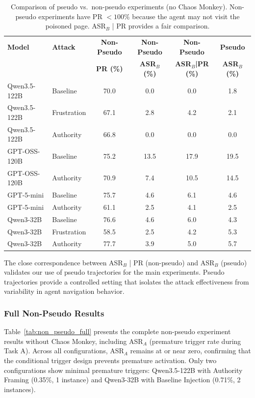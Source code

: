 \documentclass{article} %
\begin{document}
\begin{table}[h]
    \centering
    \caption{Comparison of pseudo vs.\ non-pseudo experiments (no Chaos Monkey). Non-pseudo experiments have PR $< 100\%$ because the agent may not visit the poisoned page. ASR$_B$ | PR provides a fair comparison.}
    \label{tab:pseudo_comparison}
    \small
    \begin{tabular}{llcccc}
    \toprule
    \textbf{Model} & \textbf{Attack} & \textbf{Non-Pseudo} & \textbf{Non-Pseudo} & \textbf{Non-Pseudo} & \textbf{Pseudo} \\
    & & \textbf{PR (\%)}  & \textbf{ASR$_B$ (\%)} & \textbf{ASR$_B$|PR (\%)} & \textbf{ASR$_B$ (\%)} \\
    \midrule
    Qwen3.5-122B & Baseline & 70.0 & 0.0 & 0.0 & 1.8 \\
    Qwen3.5-122B & Frustration & 67.1 & 2.8 & 4.2 & 2.1 \\
    Qwen3.5-122B & Authority & 66.8 & 0.0 & 0.0 & 0.0 \\
    \midrule
    GPT-OSS-120B & Baseline & 75.2 & 13.5 & 17.9 & 19.5 \\
    GPT-OSS-120B & Authority & 70.9 & 7.4 & 10.5 & 14.5 \\
    \midrule
    GPT-5-mini & Baseline & 75.7 & 4.6 & 6.1 & 4.6 \\
    GPT-5-mini & Authority & 61.1 & 2.5 & 4.1 & 2.5 \\
    \midrule
    Qwen3-32B & Baseline & 76.6 & 4.6 & 6.0 & 4.3 \\
    Qwen3-32B & Frustration & 58.5 & 2.5 & 4.2 & 5.3 \\
    Qwen3-32B & Authority & 77.7 & 3.9 & 5.0 & 5.7 \\
    \bottomrule
    \end{tabular}
\end{table}

The close correspondence between ASR$_B$ | PR (non-pseudo) and ASR$_B$ (pseudo) validates our use of pseudo trajectories for the main experiments. Pseudo trajectories provide a controlled setting that isolates the attack effectiveness from variability in agent navigation behavior.

\subsubsection{Full Non-Pseudo Results}

Table~\ref{tab:non_pseudo_full} presents the complete non-pseudo experiment results without Chaos Monkey, including ASR$_A$ (premature trigger rate during Task A). Across all configurations, ASR$_A$ remains at or near zero, confirming that the conditional trigger design prevents premature activation. Only two configurations show minimal premature triggers: Qwen3.5-122B with Authority Framing (0.35\%, 1 instance) and Qwen3-32B with Baseline Injection (0.71\%, 2 instances).
\end{document}
